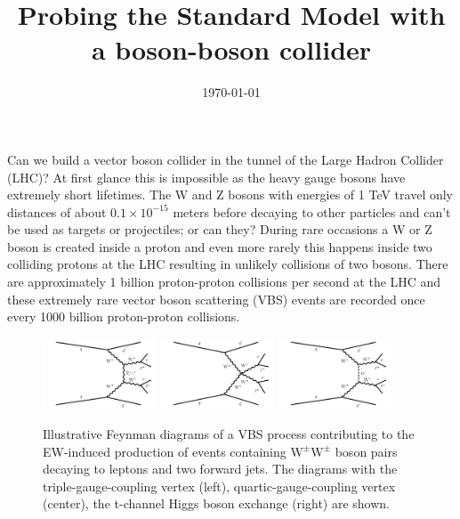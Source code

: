 \documentclass[12pt]{article}
\newcommand{\WW}{\ensuremath{\mathrm{W}^\pm\mathrm{W}^\pm}}
\begin{document}
\title{Probing the Standard Model with a boson-boson collider}
\date{\today}
\maketitle

Can we build a vector boson collider in the tunnel of the Large Hadron Collider (LHC)? At first glance this is impossible as the heavy gauge bosons have extremely short lifetimes. The W and Z bosons with energies of 1 TeV travel only distances of about $0.1 \times 10^{-15}$ meters before decaying to other particles and can't be used as targets or projectiles; or can they? During rare occasions a W or Z boson is created inside a proton and even more rarely this happens inside two colliding protons at the LHC resulting in unlikely collisions of two bosons. There are approximately 1 billion proton-proton collisions per second at the LHC and these extremely rare vector boson scattering (VBS) events are recorded once every 1000 billion proton-proton collisions.

\begin{figure}[htb]
\centering
\includegraphics[width=0.30\textwidth]{figures/leptonic_vbs_triple.pdf}
\includegraphics[width=0.30\textwidth]{figures/leptonic_vbs_quartic.pdf}
\includegraphics[width=0.30\textwidth]{figures/leptonic_vbs_higgs_tchannel.pdf}
\caption{Illustrative Feynman diagrams of a VBS process contributing to the EW-induced production of events containing $\WW$ boson pairs decaying to leptons and two forward jets. The diagrams with the triple-gauge-coupling vertex (left), quartic-gauge-coupling vertex (center), the t-channel Higgs boson exchange (right) are shown.}
\label{fig:feynman}
\end{figure}
\end{document}
